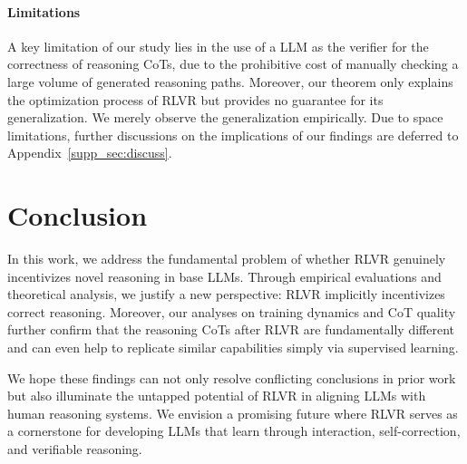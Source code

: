 \paragraph{Limitations}
A key limitation of our study lies in the use of a LLM as the verifier for the correctness of reasoning CoTs, due to the prohibitive cost of manually checking a large volume of generated reasoning paths. Moreover, our theorem only explains the optimization process of RLVR but provides no guarantee for its generalization. We merely observe the generalization empirically. 
Due to space limitations, further discussions on the implications of our findings are deferred to Appendix~\ref{supp_sec:discuss}.

\section{Conclusion}
\label{sec:conclu}

In this work, we address the fundamental problem of whether RLVR genuinely incentivizes novel reasoning in base LLMs. Through empirical evaluations and theoretical analysis, we justify a new perspective: RLVR implicitly incentivizes correct reasoning. Moreover, our analyses on training dynamics and CoT quality further confirm that the reasoning CoTs after RLVR are fundamentally different and can even help to replicate similar capabilities simply via supervised learning.

We hope these findings can not only resolve conflicting conclusions in prior work but also illuminate the untapped potential of RLVR in aligning LLMs with human reasoning systems. We envision a promising future where RLVR serves as a cornerstone for developing LLMs that learn through interaction, self-correction, and verifiable reasoning.
